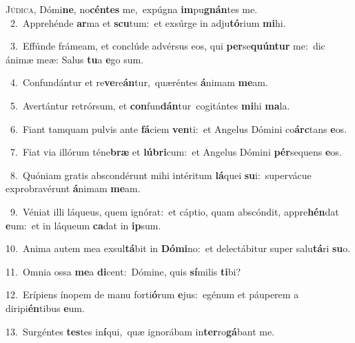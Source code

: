 \lettrine{\initial\textcolor{\initialcolor}{J}}{údica,} Dómi\-\textbf{ne}\-, no\-\textbf{cén}\-\textbf{tes} me,~\star expúgna \textbf{im}\-pu\-\textbf{gnán}\-tes me.\\
{\numbfont\textcolor{\numbcolor}{~2.}}~Apprehénde \textbf{ar}\-ma et \textbf{scu}\-tum:~\star et exsúrge in adju\-\textbf{tó}\-rium \textbf{mi}\-hi.\par
{\numbfont\textcolor{\numbcolor}{~3.}}~Effúnde frámeam, et conclúde advérsus eos, qui \textbf{per}\-se\-\textbf{quún}\-\textbf{tur} me:~\star dic ánimæ meæ: Salus \textbf{tu}\-a \textbf{e}\-go sum.\par
{\numbfont\textcolor{\numbcolor}{~4.}}~Confundántur et re\-\textbf{ve}\-re\-\textbf{án}\-tur,~\star quæréntes \textbf{á}\-nimam \textbf{me}\-am.\par
{\numbfont\textcolor{\numbcolor}{~5.}}~Avertántur retrórsum, et \textbf{con}\-fun\-\textbf{dán}\-tur~\star cogitántes \textbf{mi}\-hi \textbf{ma}\-la.\par
{\numbfont\textcolor{\numbcolor}{~6.}}~Fiant tamquam pulvis ante \textbf{fá}\-ciem \textbf{ven}\-ti:~\star et Angelus Dómini co\-\textbf{árc}\-tans \textbf{e}\-os.\par
{\numbfont\textcolor{\numbcolor}{~7.}}~Fiat via illórum téne\textbf{bræ} et \textbf{lú}\-\textbf{bri}cum:~\star et Angelus Dómini \textbf{pér}\-sequens \textbf{e}\-os.\par
{\numbfont\textcolor{\numbcolor}{~8.}}~Quóniam gratis abscondérunt mihi intéritum \textbf{lá}\-quei \textbf{su}\-i:~\star supervácue exprobravérunt \textbf{á}\-nimam \textbf{me}\-am.\par
{\numbfont\textcolor{\numbcolor}{~9.}}~Véniat illi láqueus, quem ignórat:~\dagger et cáptio, quam abscóndit, appre\-\textbf{hén}\-dat \textbf{e}\-um:~\star et in láqueum \textbf{ca}\-dat in \textbf{ip}\-sum.\par
{\numbfont\textcolor{\numbcolor}{10.}}~Anima autem mea exsul\-\textbf{tá}\-bit in \textbf{Dó}\-\textbf{mi}no:~\star et delectábitur super salu\-\textbf{tá}\-ri \textbf{su}\-o.\par
{\numbfont\textcolor{\numbcolor}{11.}}~Omnia ossa \textbf{me}\-a \textbf{di}\-cent:~\star Dómine, quis \textbf{sí}\-milis \textbf{ti}\-bi?\par
{\numbfont\textcolor{\numbcolor}{12.}}~Erípiens ínopem de manu forti\-\textbf{ó}\-rum \textbf{e}\-jus:~\star egénum et páuperem a diripi\-\textbf{én}\-tibus \textbf{e}\-um.\par
{\numbfont\textcolor{\numbcolor}{13.}}~Surgéntes \textbf{tes}\-tes in\-\textbf{í}\-qui,~\star quæ ignorábam in\-\textbf{ter}\-ro\-\textbf{gá}\-bant me.\par
